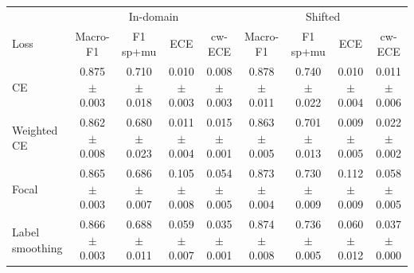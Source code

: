 \begin{tabular}{lcccccccc}
\hline
 & \multicolumn{4}{c}{In-domain} & \multicolumn{4}{c}{Shifted} \\
Loss & Macro-F1 & F1 sp+mu & ECE & cw-ECE & Macro-F1 & F1 sp+mu & ECE & cw-ECE \\
\hline
CE & 0.875 $\pm$ 0.003 & 0.710 $\pm$ 0.018 & 0.010 $\pm$ 0.003 & 0.008 $\pm$ 0.003 & 0.878 $\pm$ 0.011 & 0.740 $\pm$ 0.022 & 0.010 $\pm$ 0.004 & 0.011 $\pm$ 0.006 \\
Weighted CE & 0.862 $\pm$ 0.008 & 0.680 $\pm$ 0.023 & 0.011 $\pm$ 0.004 & 0.015 $\pm$ 0.001 & 0.863 $\pm$ 0.005 & 0.701 $\pm$ 0.013 & 0.009 $\pm$ 0.005 & 0.022 $\pm$ 0.002 \\
Focal & 0.865 $\pm$ 0.003 & 0.686 $\pm$ 0.007 & 0.105 $\pm$ 0.008 & 0.054 $\pm$ 0.005 & 0.873 $\pm$ 0.004 & 0.730 $\pm$ 0.009 & 0.112 $\pm$ 0.009 & 0.058 $\pm$ 0.005 \\
Label smoothing & 0.866 $\pm$ 0.003 & 0.688 $\pm$ 0.011 & 0.059 $\pm$ 0.007 & 0.035 $\pm$ 0.001 & 0.874 $\pm$ 0.008 & 0.736 $\pm$ 0.005 & 0.060 $\pm$ 0.012 & 0.037 $\pm$ 0.000 \\
\hline
\end{tabular}